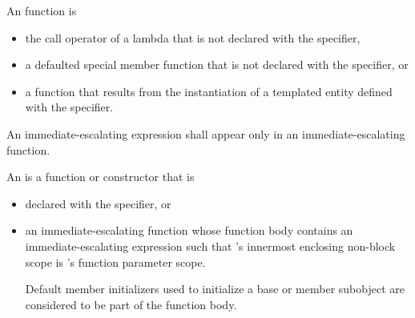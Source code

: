 \pnum
{}%
An  function is
\begin{itemize}
\item
the call operator of a lambda that is not declared
with the  specifier,
\item
a defaulted special member function
that is not declared with the  specifier, or
\item
a function that results from the instantiation
of a templated entity defined with the  specifier.
\end{itemize}
An immediate-escalating expression shall appear only
in an immediate-escalating function.

\pnum
An  is a function or constructor that is
\begin{itemize}
\item
declared with the  specifier, or
\item
an immediate-escalating function 
whose function body contains an immediate-escalating expression 
such that 's innermost enclosing non-block scope
is 's function parameter scope.
\begin{tailnote}
Default member initializers used to initialize
a base or member subobject
are considered to be part of the function body.
\end{tailnote}
\end{itemize}
